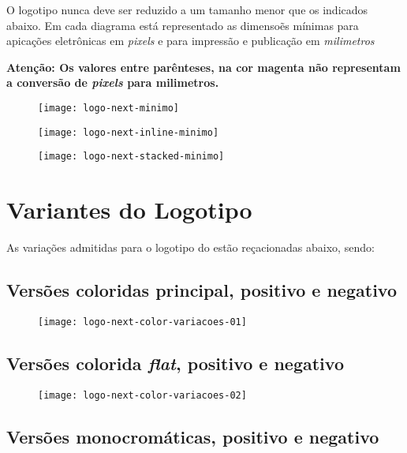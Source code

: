 \documentclass{manualmarca}
\begin{document}
O logotipo nunca deve ser reduzido a um tamanho menor que os indicados abaixo. Em cada diagrama está representado as dimensoẽs mínimas para apicações eletrônicas em \emph{pixels} e para impressão e publicação em \emph{milimetros}

\noindent
{\bfseries Atenção: Os valores entre parênteses, na cor {\color{magenta} magenta} não representam a conversão de \emph{pixels} para milimetros.}

\begin{figure}[!htp]
  \centering
  \texttt{[image: logo-next-minimo]}
\end{figure}

\begin{figure}[!htp]
  \centering
  \texttt{[image: logo-next-inline-minimo]}
\end{figure}

\begin{figure}[!htp]
  \centering
  \texttt{[image: logo-next-stacked-minimo]}
\end{figure}

\pagebreak[4]
\section{Variantes do Logotipo}
\label{sec:vari-do-logot}

As variações admitidas para o logotipo do \NExT{} estão reçacionadas abaixo, sendo:

\subsection{Versões coloridas principal, positivo e negativo}

\begin{figure}[!htp]
  \centering
  \texttt{[image: logo-next-color-variacoes-01]}
\end{figure}

\subsection{Versões colorida \emph{flat}, positivo e negativo}

\begin{figure}[!htp]
  \centering
  \texttt{[image: logo-next-color-variacoes-02]}
\end{figure}

\subsection{Versões monocromáticas, positivo e negativo}
\end{document}
